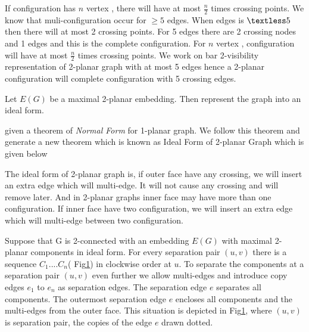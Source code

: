 If configuration has $n$ vertex , there will have at most $\frac{n}{2}$ times crossing points.
We know that muli-configuration occur for $\geq 5$ edges. When edges is $ \textless 5$ then there will at most 2 crossing points. For 5 edges there are 2 crossing nodes and 1 edges and this is the complete configuration. For $n$ vertex , configuration will have at most $\frac{n}{2}$ times crossing points. We work on bar 2-visibility representation of 2-planar graph with at most 5 edges hence a 2-planar configuration will complete configuration with 5 crossing edges.





\begin{lemma}

Let $E(G)$ be a maximal 2-planar embedding. Then represent the graph into an ideal form. 

\end{lemma}

\cite{alam} given a theorem  of \emph{Normal Form} for 1-planar graph. We follow this theorem and generate a new theorem which is known as Ideal Form of 2-planar Graph which is given below


\begin{theorem}
The ideal form of 2-planar graph is, if outer face have any crossing, we will insert an extra edge which will multi-edge. It will not cause any crossing and will remove later. And in 2-planar graphs inner face may have more than one configuration. If inner face have two configuration, we will insert an extra edge which will multi-edge between two configuration.
\end{theorem}



\begin{figure}[!tb]
\centering
\resizebox{100mm}{!}{}

\label{fig:component}
\end{figure}




Suppose that G is 2-connected with an embedding $E(G)$ with maximal 2-planar components in ideal form. For every separation pair $(u,v)$ there is a sequence  $C_1.... C_{n}$( Fig\ref{fig:component}) in clockwise order at $u$. To separate the components at a separation pair $(u,v)$ even further we allow multi-edges and introduce copy edges $e_1$ to $e_n$ as separation edges. The separation edge $e$ separates all components. The outermost separation edge $e$ encloses all components and the multi-edges from the outer face. This situation is depicted in Fig\ref{fig:component}, where $(u , v)$ is separation pair, the copies of the edge $e$ drawn dotted.


